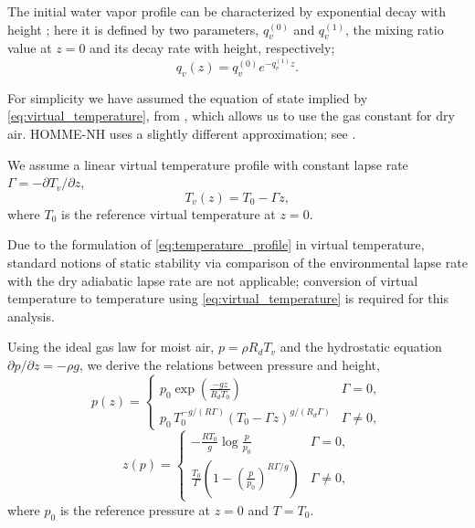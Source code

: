 The initial water vapor profile can be characterized by exponential decay with height \cite{Hashimoto2005,Palchetti2008}; here it is defined by two parameters, $q_v^{(0)}$ and $q_v^{(1)}$, the mixing ratio value at $z=0$ and its decay rate with height, respectively;
\begin{equation}\label{eq:qv_profile}
  q_v(z) = q_v^{(0)}e^{-q_v^{(1)}z}.
\end{equation}

For simplicity we have assumed the equation of state implied by \eqref{eq:virtual_temperature}, from \cite{KlempWilhelmson1978}, which allows us to use the gas constant for dry air.  
   HOMME-NH uses a slightly different approximation; see \cite[sec.~2.3]{Taylor2020}.
   
We assume a linear virtual temperature profile with constant lapse rate $\Gamma = -\partial T_v/\partial z$,
\begin{equation}\label{eq:temperature_profile}
  T_v(z) = T_0 - \Gamma z,
\end{equation}
where $T_0$ is the reference virtual temperature at $z=0$.  

\begin{rem}
  Due to the formulation of \eqref{eq:temperature_profile} in virtual temperature, standard notions of static stability via comparison of the environmental lapse rate with the dry adiabatic lapse rate are not applicable; conversion of virtual temperature to temperature using \eqref{eq:virtual_temperature} is required for this analysis.
\end{rem}

Using the ideal gas law for moist air, $p = \rho R_d T_v$ and the hydrostatic equation $\partial p/\partial z = -\rho g$, we derive the relations between pressure and height,
\begin{equation}\label{eq:hydrostatic_pressure_profile}
  p(z) = \begin{cases}
          p_0\exp\left(\frac{-g z}{R_dT_0}\right) & \Gamma = 0,\\[0.5em]
          p_0\, T_0^{-g/(R\Gamma)}\left(T_0 - \Gamma z\right)^{g/(R_d\Gamma)} & \Gamma \ne 0,
        \end{cases}
\end{equation}
\begin{equation}\label{eq:hydrostatic_height_profile}
  z(p) = \begin{cases}
         -\frac{R T_0}{g}\log\frac{p}{p_0} & \Gamma = 0,\\[0.5em]
         \frac{T_0}{\Gamma}\left(1 - \left(\frac{p}{p_0}\right)^{R\Gamma/g}\right) & \Gamma \ne 0,
       \end{cases}
\end{equation}
where $p_0$ is the reference pressure at $z=0$ and $T=T_0$.

